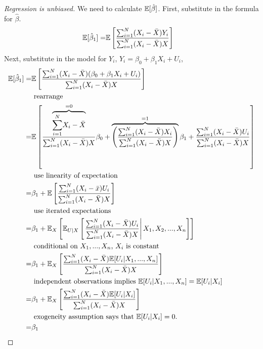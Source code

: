 \begin{frame}[shrink]
\begin{proof}[Regression is unbiased]
  We need to calculate $\mathbb{E}[\hat{\beta}]$. First, substitute in the
  formula for $\hat{\beta}$.
  \begin{align*}
    \mathbb{E}[\hat{\beta}_1] = & \mathbb{E}\left[ \frac{{\sum_{i=1}^N} (X_i - \bar{X}) Y_i
      }{{\sum_{i=1}^N} (X_i - \bar{X})X } \right] 
  \end{align*}
  Next, substitute in the model for $Y_i$, $Y_i = \beta_0 + \beta_1
  X_i + U_i$, 
  \begin{align*}
    \mathbb{E}[\hat{\beta}_1] = & \mathbb{E}\left[ \frac{{\sum_{i=1}^N} (X_i - \bar{X}) (\beta_0 + \beta_1
  X_i + U_i)
      }{{\sum_{i=1}^N} (X_i - \bar{X})X } \right] \\
    & \text{ rearrange } \\
    = & \mathbb{E}\left[ \frac{ \overbrace{{\sum_{i=1}^N} X_i - \bar{X}}^{=0}}{{\sum_{i=1}^N}
        (X_i - \bar{X})X } \beta_0 + \overbrace{\left(\frac{{\sum_{i=1}^N} (X_i - \bar{X})
            X_i}{{\sum_{i=1}^N} (X_i - \bar{X})X }\right)}^{=1} \beta_1 +
      \frac{{\sum_{i=1}^N} (X_i - \bar{X})U_i} {{\sum_{i=1}^N} (X_i - \bar{X})X }
    \right] \\
    & \text{ use linearity of expectation } \\ 
    = & \beta_1 + \mathbb{E}\left[ \frac{{\sum_{i=1}^N} (X_i - \bar{x})U_i} {{\sum_{i=1}^N} (X_i - \bar{X})X }
    \right] \\
    & \text{ use iterated expectations } \\
    = & \beta_1 + \mathbb{E}_X\left[ \mathbb{E}_{U|X}\left[\left. \frac{{\sum_{i=1}^N} (X_i -
            \bar{X})U_i} {{\sum_{i=1}^N} (X_i - \bar{X})X} \right\vert X_1,
        X_2, ..., X_n \right]\right] \\
    & \text{ conditional on $X_1, ..., X_n$, $X_i$ is constant} \\
    = & \beta_1 + \mathbb{E}_X\left[ \frac{{\sum_{i=1}^N} (X_i -
        \bar{X})\mathbb{E}[U_i|X_1, ..., X_n]} {{\sum_{i=1}^N} (X_i -
        \bar{X})X} \right] \\
    & \text{ independent observations implies $\mathbb{E}[U_i|X_1, ...,
      X_n] = \mathbb{E}[U_i | X_i]$ } \\
    = & \beta_1 + \mathbb{E}_X\left[ \frac{{\sum_{i=1}^N} (X_i -
        \bar{X})\mathbb{E}[U_i|X_i]} {{\sum_{i=1}^N} (X_i - \bar{X})X} \right] \\
    & \text{ exogeneity assumption says that $\mathbb{E}[U_i | X_i] =
      0$.} \\ 
    = & \beta_1
  \end{align*}
\end{proof}
\end{frame}

